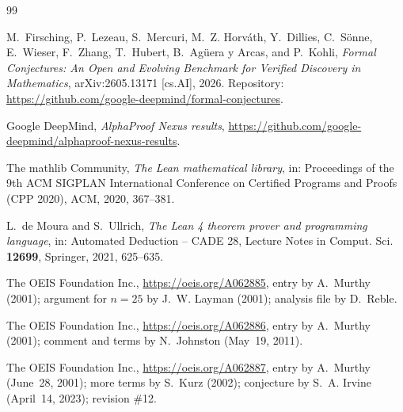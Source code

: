 \documentclass[11pt]{amsart}
\theoremstyle{plain}
\theoremstyle{definition}
\begin{document}
{\small\raggedright
\begin{thebibliography}{99}

M.~Firsching, P.~Lezeau, S.~Mercuri, M.~Z. Horv\'ath, Y.~Dillies, C.~S\"onne, E.~Wieser, F.~Zhang, T.~Hubert, B.~Ag\"uera y Arcas, and P.~Kohli, \emph{Formal Conjectures: An Open and Evolving Benchmark for Verified Discovery in Mathematics}, arXiv:2605.13171 [cs.AI], 2026. Repository: \url{https://github.com/google-deepmind/formal-conjectures}.

Google DeepMind, \emph{AlphaProof Nexus results}, \url{https://github.com/google-deepmind/alphaproof-nexus-results}.

The mathlib Community, \emph{The Lean mathematical library}, in: Proceedings of the 9th ACM SIGPLAN International Conference on Certified Programs and Proofs (CPP 2020), ACM, 2020, 367--381.

L.~de Moura and S.~Ullrich, \emph{The Lean 4 theorem prover and programming language}, in: Automated Deduction -- CADE 28, Lecture Notes in Comput. Sci. \textbf{12699}, Springer, 2021, 625--635.

The OEIS Foundation Inc., \url{https://oeis.org/A062885}, entry by A.~Murthy (2001); argument for $n=25$ by J.~W. Layman (2001); analysis file by D.~Reble.

The OEIS Foundation Inc., \url{https://oeis.org/A062886}, entry by A.~Murthy (2001); comment and terms by N.~Johnston (May~19, 2011).

The OEIS Foundation Inc., \url{https://oeis.org/A062887}, entry by A.~Murthy (June~28, 2001); more terms by S.~Kurz (2002); conjecture by S.~A. Irvine (April~14, 2023); revision \#12.

\end{thebibliography}
}
\end{document}
